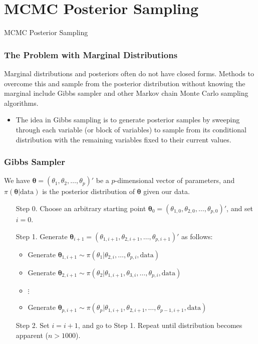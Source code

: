 \documentclass{beamer}
\begin{document}
\section{MCMC Posterior Sampling}
\begin{frame}[c]
\begin{center}
\huge
MCMC Posterior Sampling
\end{center}
\end{frame}

\begin{frame}
\frametitle{The Problem with Marginal Distributions}
Marginal distributions and posteriors often do  not have closed forms. Methods to overcome this and sample from the posterior distribution without knowing the marginal include Gibbs sampler and other Markov chain Monte Carlo sampling algorithms. 
\begin{itemize}
\item The idea in Gibbs sampling is to generate posterior samples by sweeping through each variable (or block of variables) to sample from its conditional distribution with the remaining variables fixed to their current values.\footnotemark
\end{itemize}
\end{frame}

\begin{frame}
\frametitle{Gibbs Sampler}
We have $\pmb{\theta} = (\theta_1, \theta_2, \ldots, \theta_p)'$ be a $p$-dimensional vector of parameters, and $\pi(\pmb{\theta}|\text{data})$ is the posterior distribution of $\pmb{\theta}$ given our data. 
\begin{enumerate}
\item[Step 0.] Choose an arbitrary starting point $\pmb{\theta}_{0} = (\theta_{1,0}, \theta_{2,0}, \ldots, \theta_{p,0})'$, and set $i = 0$.
\item [Step 1.] Generate $\pmb{\theta}_{i+1} = (\theta_{1,i+1}, \theta_{2,i+1}, \ldots, \theta_{p,i+1})'$ as follows:
	\begin{itemize}
	\item Generate $\pmb{\theta}_{1,i+1} \sim \pi(\theta_1|\theta_{2,i}, \ldots, \theta_{p,i},\text{data})$
	\item Generate $\pmb{\theta}_{2,i+1} \sim \pi(\theta_2|\theta_{1,i+1}, \theta_{3,i}, \ldots, \theta_{p,i},\text{data})$
	\item $\vdots$
	\item Generate $\pmb{\theta}_{p,i+1} \sim \pi(\theta_p|\theta_{1,i+1}, \theta_{2,i+1}, \ldots, \theta_{p-1,i+1}, \text{data})$
	\end{itemize}
\item [Step 2.] Set $i = i+1$, and go to Step 1.
Repeat until distribution becomes apparent ($n > 1000$).\footnotemark[1]
\end{enumerate}
\end{frame}
\end{document}
